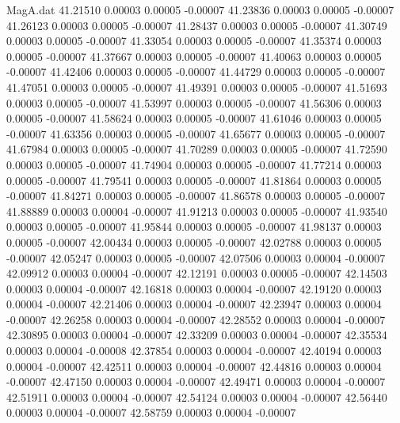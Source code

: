 \begin{filecontents}{MagA.dat}
  41.21510    0.00003    0.00005   -0.00007
  41.23836    0.00003    0.00005   -0.00007
  41.26123    0.00003    0.00005   -0.00007
  41.28437    0.00003    0.00005   -0.00007
  41.30749    0.00003    0.00005   -0.00007
  41.33054    0.00003    0.00005   -0.00007
  41.35374    0.00003    0.00005   -0.00007
  41.37667    0.00003    0.00005   -0.00007
  41.40063    0.00003    0.00005   -0.00007
  41.42406    0.00003    0.00005   -0.00007
  41.44729    0.00003    0.00005   -0.00007
  41.47051    0.00003    0.00005   -0.00007
  41.49391    0.00003    0.00005   -0.00007
  41.51693    0.00003    0.00005   -0.00007
  41.53997    0.00003    0.00005   -0.00007
  41.56306    0.00003    0.00005   -0.00007
  41.58624    0.00003    0.00005   -0.00007
  41.61046    0.00003    0.00005   -0.00007
  41.63356    0.00003    0.00005   -0.00007
  41.65677    0.00003    0.00005   -0.00007
  41.67984    0.00003    0.00005   -0.00007
  41.70289    0.00003    0.00005   -0.00007
  41.72590    0.00003    0.00005   -0.00007
  41.74904    0.00003    0.00005   -0.00007
  41.77214    0.00003    0.00005   -0.00007
  41.79541    0.00003    0.00005   -0.00007
  41.81864    0.00003    0.00005   -0.00007
  41.84271    0.00003    0.00005   -0.00007
  41.86578    0.00003    0.00005   -0.00007
  41.88889    0.00003    0.00004   -0.00007
  41.91213    0.00003    0.00005   -0.00007
  41.93540    0.00003    0.00005   -0.00007
  41.95844    0.00003    0.00005   -0.00007
  41.98137    0.00003    0.00005   -0.00007
  42.00434    0.00003    0.00005   -0.00007
  42.02788    0.00003    0.00005   -0.00007
  42.05247    0.00003    0.00005   -0.00007
  42.07506    0.00003    0.00004   -0.00007
  42.09912    0.00003    0.00004   -0.00007
  42.12191    0.00003    0.00005   -0.00007
  42.14503    0.00003    0.00004   -0.00007
  42.16818    0.00003    0.00004   -0.00007
  42.19120    0.00003    0.00004   -0.00007
  42.21406    0.00003    0.00004   -0.00007
  42.23947    0.00003    0.00004   -0.00007
  42.26258    0.00003    0.00004   -0.00007
  42.28552    0.00003    0.00004   -0.00007
  42.30895    0.00003    0.00004   -0.00007
  42.33209    0.00003    0.00004   -0.00007
  42.35534    0.00003    0.00004   -0.00008
  42.37854    0.00003    0.00004   -0.00007
  42.40194    0.00003    0.00004   -0.00007
  42.42511    0.00003    0.00004   -0.00007
  42.44816    0.00003    0.00004   -0.00007
  42.47150    0.00003    0.00004   -0.00007
  42.49471    0.00003    0.00004   -0.00007
  42.51911    0.00003    0.00004   -0.00007
  42.54124    0.00003    0.00004   -0.00007
  42.56440    0.00003    0.00004   -0.00007
  42.58759    0.00003    0.00004   -0.00007

\end{filecontents}
